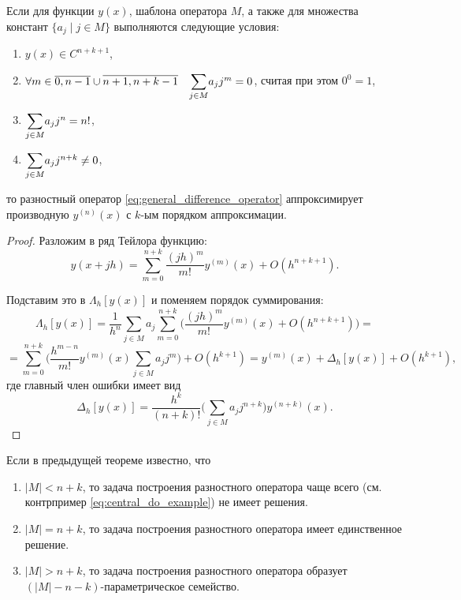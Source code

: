 \documentclass[../main.tex]{subfile}
\begin{document}
\begin{theorem}\label{eq:general_difference_operator_theorem}
	Если для функции $y(x)$, шаблона оператора $M$, а также для множества
	констант $\{a_j\mid j\in M\}$ выполняются следующие условия:
	\begin{enumerate}[noitemsep]
		\item $y(x)\in C^{n+k+1}$,
		\item $\forall m\in\overline{0,n-1}\cup\overline{n+1,n+k-1}
			\quad\mathlarger\sum_{j\in M}a_jj^m=0$, считая при этом
			$0^0=1$,
		\item $\mathlarger\sum_{j\in M}a_jj^n=n!$,
		\item $\mathlarger\sum_{j\in M}a_jj^{n+k}\ne 0$,
	\end{enumerate}
	то разностный оператор \eqref{eq:general_difference_operator}
	аппроксимирует производную $y^{(n)}(x)$ с $k$-ым порядком аппроксимации.
\end{theorem}

\begin{proof}
	Разложим в ряд Тейлора функцию:
	\[y(x+jh)=\sum_{m=0}^{n+k}\frac{(jh)^m}{m!}y^{(m)}(x)+O(h^{n+k+1}).\]

	Подставим это в $\Lambda_h[y(x)]$ и поменяем порядок суммирования:
	\[\Lambda_h[y(x)]=\frac{1}{h^n}\sum_{j\in M}a_j\sum_{m=0}^{n+k}\Big(
	\frac{(jh)^m}{m!}y^{(m)}(x)+O(h^{n+k+1})\Big)=\]
	\[=\sum_{m=0}^{n+k}\Big(\frac{h^{m-n}}{m!}y^{(m)}(x)\sum_{j\in M}
	a_jj^m\Big)+O(h^{k+1})=y^{(m)}(x)+\Delta_h[y(x)]+O(h^{k+1}),\]
	где главный член ошибки имеет вид
	\[\Delta_h[y(x)]=\frac{h^k}{(n+k)!}\Big(\sum_{j\in M}a_jj^{n+k}\Big)
	y^{(n+k)}(x).\]
\end{proof}

\begin{corollary}
	Если в предыдущей теореме известно, что
	\begin{enumerate}[nosep]
		\item $|M|<n+k$, то задача построения разностного оператора чаще
			всего (см. контрпример \eqref{eq:central_do_example})
			не имеет решения.
		\item $|M|=n+k$, то задача построения разностного оператора
			 имеет единственное решение.
		\item $|M|>n+k$, то задача построения разностного оператора
			образует $(|M|-n-k)$-параметрическое семейство.
	\end{enumerate}
\end{corollary}
\end{document}
